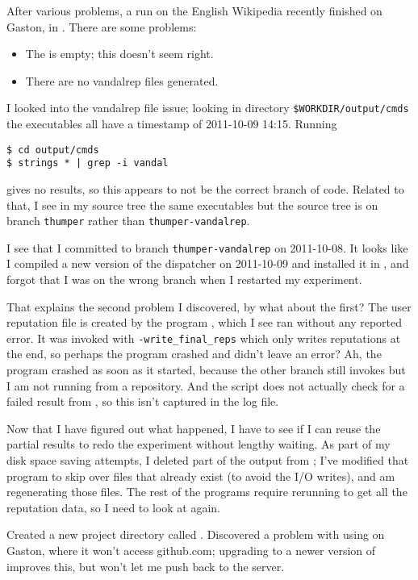 After various problems, a run on the English Wikipedia recently finished
on Gaston, in .
There are some problems:
\begin{itemize}
\item The  is empty; this doesn't seem
right.
\item There are no vandalrep files generated.
\end{itemize}
I looked into the vandalrep file issue; looking in directory
\texttt{\$WORKDIR/output/cmds} the executables all have a timestamp of
2011-10-09 14:15.
Running
\begin{verbatim}
$ cd output/cmds
$ strings * | grep -i vandal
\end{verbatim}
gives no results, so this appears to not be the correct branch of code.
Related to that, I see in my source tree the same executables but the
source tree is on branch \texttt{thumper} rather than
\texttt{thumper-vandalrep}.

I see that I committed to branch \texttt{thumper-vandalrep} on 2011-10-08.
It looks like I compiled a new version of the dispatcher on 2011-10-09
and installed it in , and forgot that I was on
the wrong branch when I restarted my experiment.

That explains the second problem I discovered, by what about the first?
The user reputation file is created by the program
, which I see ran without any reported error.
It was invoked with \texttt{-write\_final\_reps} which only writes
reputations at the end, so perhaps the program crashed and didn't leave
an error?
Ah, the program crashed as soon as it started, because the other branch
still invokes  but I am not running from a 
repository.
And the  script does not actually check for a
failed result from , so this isn't
captured in the log file.

Now that I have figured out what happened, I have to see if I can reuse
the partial results to redo the experiment without lengthy waiting.
As part of my disk space saving attempts, I deleted part of the output
from ; I've modified that program to skip over files
that already exist (to avoid the I/O writes), and am regenerating those
files.  The rest of the programs require rerunning to get all the
reputation data, so I need to look at  again.

Created a new project directory called .
Discovered a problem with using  on Gaston, where it won't
access github.com;
upgrading to a newer version of  improves this, but won't
let me push back to the server.


